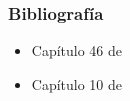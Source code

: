 \begin{frame}
	\frametitle{Bibliografía}
    
    \begin{itemize}
        \item Capítulo 46 de \cite{siciliano2016handbook}
        \item Capítulo 10 de \cite{thrun2005probabilistic}
    \end{itemize}    

    \nocite{grisetti2010tutorial}
    \nocite{chebrolu2021adaptive}
    \nocite{dellaert2017factor}

	
	\printbibliography
	
\end{frame}